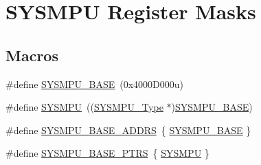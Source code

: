 \hypertarget{group___s_y_s_m_p_u___register___masks}{}\section{S\+Y\+S\+M\+PU Register Masks}
\label{group___s_y_s_m_p_u___register___masks}
\subsection*{Macros}
\begin{DoxyCompactItemize}
\item 
\#define \mbox{\hyperlink{group___s_y_s_m_p_u___register___masks_ga377b5f232e8f11cd457d6e69da03d692}{S\+Y\+S\+M\+P\+U\+\_\+\+B\+A\+SE}}~(0x4000\+D000u)
\item 
\#define \mbox{\hyperlink{group___s_y_s_m_p_u___register___masks_gabd7e48c068a1331dd1738656e3c56502}{S\+Y\+S\+M\+PU}}~((\mbox{\hyperlink{struct_s_y_s_m_p_u___type}{S\+Y\+S\+M\+P\+U\+\_\+\+Type}} $\ast$)\mbox{\hyperlink{group___s_y_s_m_p_u___register___masks_ga377b5f232e8f11cd457d6e69da03d692}{S\+Y\+S\+M\+P\+U\+\_\+\+B\+A\+SE}})
\item 
\#define \mbox{\hyperlink{group___s_y_s_m_p_u___register___masks_gacf3a38a82e268caba62ba6563154fe74}{S\+Y\+S\+M\+P\+U\+\_\+\+B\+A\+S\+E\+\_\+\+A\+D\+D\+RS}}~\{ \mbox{\hyperlink{group___s_y_s_m_p_u___register___masks_ga377b5f232e8f11cd457d6e69da03d692}{S\+Y\+S\+M\+P\+U\+\_\+\+B\+A\+SE}} \}
\item 
\#define \mbox{\hyperlink{group___s_y_s_m_p_u___register___masks_gaa9e3c9249411bd3f83d7d18105d09fd2}{S\+Y\+S\+M\+P\+U\+\_\+\+B\+A\+S\+E\+\_\+\+P\+T\+RS}}~\{ \mbox{\hyperlink{group___s_y_s_m_p_u___register___masks_gabd7e48c068a1331dd1738656e3c56502}{S\+Y\+S\+M\+PU}} \}
\end{DoxyCompactItemize}
